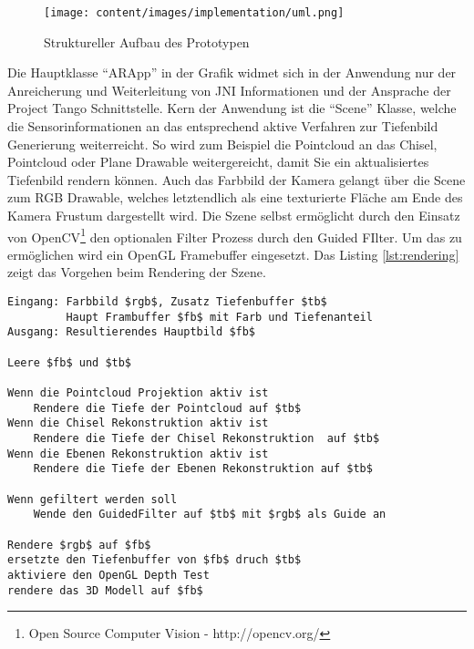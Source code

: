 \begin{figure}[h]
  \centering
	\texttt{[image: content/images/implementation/uml.png]} 
  \caption{Struktureller Aufbau des Prototypen}
  \label{fig:structure}
\end{figure}

Die Hauptklasse \enquote{ARApp} in der Grafik widmet sich in der Anwendung nur der Anreicherung und Weiterleitung von JNI Informationen und der Ansprache der Project Tango Schnittstelle. Kern der Anwendung ist die \enquote{Scene} Klasse, welche die Sensorinformationen an das entsprechend aktive Verfahren zur Tiefenbild Generierung weiterreicht. So wird zum Beispiel die Pointcloud an das Chisel, Pointcloud oder Plane Drawable weitergereicht, damit Sie ein aktualisiertes Tiefenbild rendern können. Auch das Farbbild der Kamera gelangt über die Scene zum RGB Drawable, welches letztendlich als eine texturierte Fläche am Ende des Kamera Frustum dargestellt wird. Die Szene selbst ermöglicht durch den Einsatz von OpenCV\footnote{Open Source Computer Vision - http://opencv.org/} den optionalen Filter Prozess durch den Guided FIlter. Um das zu ermöglichen wird ein OpenGL Framebuffer eingesetzt. Das Listing \ref{lst:rendering} zeigt das Vorgehen beim Rendering der Szene.

\begin{lstlisting}[mathescape,caption=Rendering der Szene, label=lst:rendering, float=htbp]
Eingang: Farbbild $rgb$, Zusatz Tiefenbuffer $tb$
         Haupt Frambuffer $fb$ mit Farb und Tiefenanteil
Ausgang: Resultierendes Hauptbild $fb$

Leere $fb$ und $tb$

Wenn die Pointcloud Projektion aktiv ist
    Rendere die Tiefe der Pointcloud auf $tb$
Wenn die Chisel Rekonstruktion aktiv ist
    Rendere die Tiefe der Chisel Rekonstruktion  auf $tb$
Wenn die Ebenen Rekonstruktion aktiv ist
    Rendere die Tiefe der Ebenen Rekonstruktion auf $tb$
    
Wenn gefiltert werden soll
    Wende den GuidedFilter auf $tb$ mit $rgb$ als Guide an
        
Rendere $rgb$ auf $fb$ 
ersetzte den Tiefenbuffer von $fb$ druch $tb$
aktiviere den OpenGL Depth Test
rendere das 3D Modell auf $fb$
\end{lstlisting}
